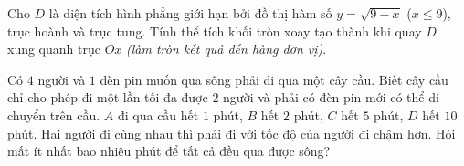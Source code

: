 \begin{ex}%
Cho $D$ là diện tích hình phẳng giới hạn bởi đồ thị hàm số $y=\sqrt{9-x}$ ($x\le 9$), trục hoành và trục tung. Tính thể tích khối tròn xoay tạo thành khi quay $D$ xung quanh trục $Ox$ {\it (làm tròn kết quả đến hàng đơn vị)}.
\end{ex}

\begin{ex}%
Có $4$ người và $1$ đèn pin muốn qua sông phải đi qua một cây cầu. Biết cây cầu chỉ cho phép đi một lần tối đa được $2$ người và phải có đèn pin mới có thể di chuyển trên cầu. $A$ đi qua cầu hết $1$ phút, $B$ hết $2$ phút, $C$ hết $5$ phút, $D$ hết $10$ phút. Hai người đi cùng nhau thì phải đi với tốc độ của người đi chậm hơn. Hỏi mất ít nhất bao nhiêu phút để tất cả đều qua được sông?
\end{ex}

